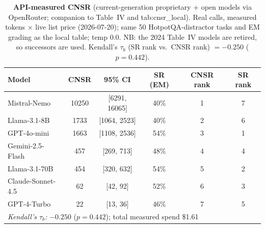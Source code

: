 \begin{table}[t]
\centering
\caption{\textbf{API-measured CNSR} (current-generation proprietary + open models via OpenRouter; companion to Table~IV and tab:cnsr\_local). Real calls, measured tokens $\times$ live list price (2026-07-20); same 50 HotpotQA-distractor tasks and EM grading as the local table; temp 0.0. NB: the 2024 Table~IV models are retired, so successors are used. Kendall's $\tau_b$ (SR rank vs.\ CNSR rank) $=-0.250$ ($p=0.442$).}
\label{tab:cnsr_api}
\begin{tabular}{lccccc}
\toprule
Model & CNSR & 95\% CI & SR (EM) & CNSR rank & SR rank \\
\midrule
Mistral-Nemo & 10250 & [6291, 16065] & 40\% & 1 & 7 \\
Llama-3.1-8B & 1733 & [1064, 2523] & 40\% & 2 & 6 \\
GPT-4o-mini & 1663 & [1108, 2536] & 54\% & 3 & 1 \\
Gemini-2.5-Flash & 457 & [269, 713] & 48\% & 4 & 4 \\
Llama-3.1-70B & 454 & [320, 632] & 54\% & 5 & 2 \\
Claude-Sonnet-4.5 & 62 & [42, 92] & 52\% & 6 & 3 \\
GPT-4-Turbo & 22 & [13, 36] & 46\% & 7 & 5 \\
\midrule
\multicolumn{6}{l}{\textit{Kendall's $\tau_b$:} $-0.250$ ($p=0.442$); total measured spend \$1.61} \\
\bottomrule
\end{tabular}
\end{table}
